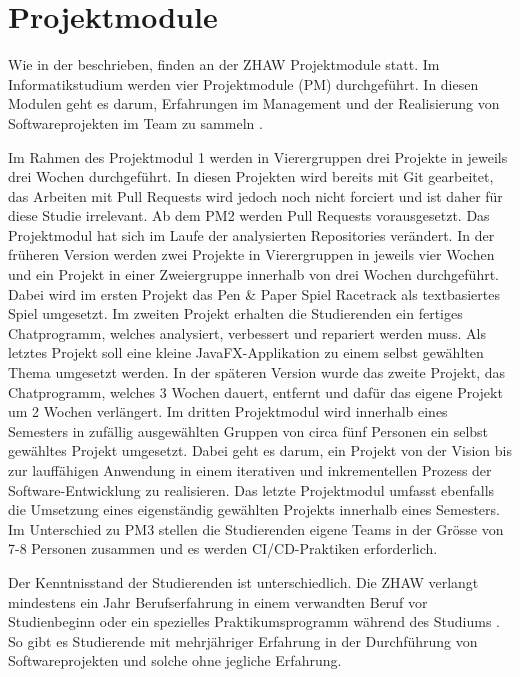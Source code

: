 \section{Projektmodule}
\label{sec:Projektmodule} 
Wie in der  beschrieben, finden an der ZHAW Projektmodule statt. Im  Informatikstudium werden vier Projektmodule (PM) durchgeführt. In diesen Modulen geht es darum, Erfahrungen im Management und der Realisierung von Softwareprojekten im Team zu sammeln \parencite{noauthor_modul_nodate}. 

Im Rahmen des Projektmodul 1 werden in Vierergruppen drei Projekte in jeweils drei Wochen durchgeführt. In diesen Projekten wird bereits mit Git gearbeitet, das Arbeiten mit Pull Requests wird jedoch noch nicht forciert und ist daher für diese Studie irrelevant. Ab dem PM2 werden Pull Requests vorausgesetzt. Das Projektmodul hat sich im Laufe der analysierten Repositories verändert. In der früheren Version werden zwei Projekte in Vierergruppen in jeweils vier Wochen und ein Projekt in einer Zweiergruppe innerhalb von drei Wochen durchgeführt. Dabei wird im ersten Projekt das Pen \& Paper Spiel Racetrack als textbasiertes Spiel umgesetzt. Im zweiten Projekt erhalten die Studierenden ein fertiges Chatprogramm, welches analysiert, verbessert und repariert werden muss. Als letztes Projekt soll eine kleine JavaFX-Applikation zu einem selbst gewählten Thema umgesetzt werden. In der späteren Version wurde das zweite Projekt, das Chatprogramm, welches 3 Wochen dauert, entfernt und dafür das eigene Projekt um 2 Wochen verlängert. Im dritten Projektmodul wird innerhalb eines Semesters in zufällig ausgewählten Gruppen von circa fünf Personen ein selbst gewähltes Projekt umgesetzt. Dabei geht es darum, ein Projekt von der Vision bis zur lauffähigen Anwendung in einem iterativen und inkrementellen Prozess der Software-Entwicklung zu realisieren. Das letzte Projektmodul umfasst ebenfalls die Umsetzung eines eigenständig gewählten Projekts innerhalb eines Semesters. Im Unterschied zu PM3 stellen die Studierenden eigene Teams in der Grösse von 7-8 Personen zusammen und es werden CI/CD-Praktiken erforderlich.

Der Kenntnisstand der Studierenden ist unterschiedlich. Die ZHAW verlangt mindestens ein Jahr Berufserfahrung in einem verwandten Beruf vor Studienbeginn oder ein spezielles Praktikumsprogramm während des Studiums \parencite{noauthor_aufnahmebedingungen_nodate}. So gibt es Studierende mit mehrjähriger Erfahrung in der Durchführung von Softwareprojekten und solche ohne jegliche Erfahrung. 

